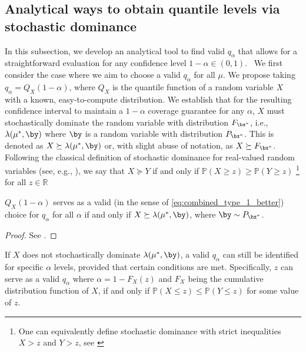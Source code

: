 \documentclass[11pt]{article}
\numberwithin{equation}{section}
\numberwithin{figure}{section}
\begin{document}
\subsection[Analytical ways to obtain quantile levels via stochastic dominance]{Analytical ways to obtain quantile levels via stochastic dominance}
\label{subsec:stochastic_dominance}

In this subsection, we develop an analytical tool to find valid $q_\alpha$ that allows for a straightforward evaluation for any confidence level $1-\alpha \in (0, 1)$. \
We first consider the case where we aim to choose a valid $q_\alpha$ for all $\mu$. 
We propose taking $q_\alpha = Q_X(1-\alpha)$, where $Q_X$ is the quantile function of a random variable $X$ with a known, easy-to-compute distribution. 
We establish that for the resulting confidence interval to maintain a $1 - \alpha$ coverage guarantee for any $\alpha$, $X$ must stochastically dominate the random variable with distribution $F_{\bx^*}$, i.e., $\lambda(\mu^*, \by)$ where $\by$ is a random variable with distribution $P_{\bx^*}$. 
This is denoted as $X \succeq \lambda(\mu^*, \by)$ or, with slight abuse of notation, as $X \succeq F_{\bx^*}$.
Following the classical definition of stochastic dominance for real-valued random variables (see, e.g., \cite{shaked2007stochastic}), we say that $X \succeq Y$ if and only if $\mathbb{P}(X \geq z) \geq \mathbb{P}(Y \geq z)$ \footnote{One can equivalently define stochastic dominance with strict inequalities $X > z$ and $Y > z$, see \cite{shaked2007stochastic}} for all $z \in \mathbb{R}$

\begin{lemma}
\label{lemma:SD}
$Q_X(1-\alpha)$ serves as a valid (in the sense of \eqref{eq:combined_type_1_better}) choice for $q_\alpha$ for all $\alpha$ if and only if $X \succeq \lambda(\mu^*, \by)$, where $\by \sim P_{\bx^*}$.
\end{lemma}
\begin{proof}
    See .
\end{proof}

\begin{remark}
\label{remark:sd}
If $X$ does not stochastically dominate $\lambda(\mu^*, \by)$, a valid $q_\alpha$ can still be identified for specific $\alpha$ levels, provided that certain conditions are met. 
Specifically, $z$ can serve as a valid $q_\alpha$ where $\alpha = 1 - F_X(z)$ and $F_X$ being the cumulative distribution function of $X$, if and only if $\mathbb{P}(X \leq z) \leq \mathbb{P}(Y \leq z)$ for some value of $z$.
\end{remark}
\end{document}
